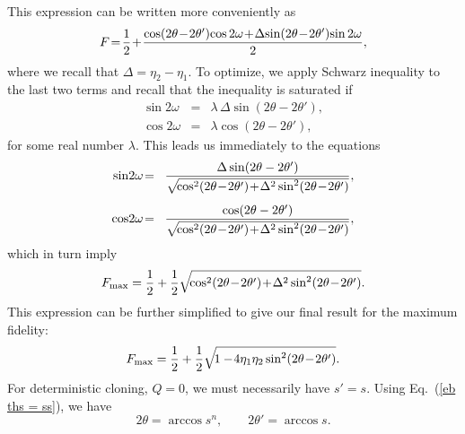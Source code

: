 \documentclass[aps,pra,twocolumn,showpacs]{revtex4-1}
\begin{document}
%
This expression can be written more conveniently as
\begin{equation}
F\!=\!{1\over2}\!+\!{\cos\!\left(2\theta\!-\!2\theta'\right)\!\cos2\omega
\!+\!\Delta\!\sin\!\left(2\theta\!-\!2\theta'\right)\!\sin2\omega
\over 2},
\end{equation}
%
where we recall that $\Delta=\eta_2-\eta_1$.
To optimize, we apply Schwarz inequality to the last two terms and recall that the inequality is saturated if
%
\begin{eqnarray}
\sin2\omega&=&\lambda\,\Delta\sin(2\theta\!-\!2\theta'),\nonumber\\
\cos2\omega&=&\lambda\cos(2\theta\!-\!2\theta'),
\end{eqnarray}
%
for some real number $\lambda$.
This leads us immediately to the equations
%
\begin{eqnarray}
\sin\!2\omega&\!=\!&
{\Delta\sin(2\theta-2\theta')\over\sqrt{\!\cos^2(2\theta\!-\!2\theta')\!+\!\Delta^2\sin^2(2\theta\!-\!2\theta')}},\nonumber\\[.5em]
\cos\!2\omega&\!=\!&
{\cos(2\theta-2\theta')\over\sqrt{\!\cos^2(2\theta\!-\!2\theta')\!+\!\Delta^2\sin^2(2\theta\!-\!2\theta')}},
\end{eqnarray}
%
which in turn imply
%
\begin{equation}
F_{\rm max}={1\over2}+{1\over2}
\sqrt{\!\cos^2(2\theta\!-\!2\theta')\!+\!\Delta^2\sin^2(2\theta\!-\!2\theta')} .
\end{equation}
%
This expression can be further simplified to give our final result for the maximum fidelity:
%
\begin{equation}
F_{\rm max}={1\over2}+{1\over2}
\sqrt{\!1-\!4\eta_1\eta_2\sin^2(2\theta\!-\!2\theta')} .
%
\vspace{.2em}
%
\label{F_max}
\end{equation}
%
For deterministic cloning, $Q=0$, we must necessarily have $s'=s$. 
Using Eq.~(\ref{eb ths = ss}), we have
$$
2\theta=\arccos s^n,\qquad  2\theta'=\arccos s.
$$


\bigskip
\end{document}
